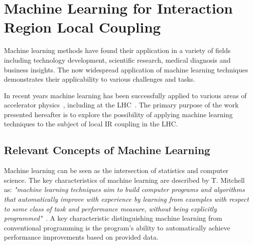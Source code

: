 \chapter{Machine Learning for Interaction Region Local Coupling}
\label{chapter:ml_local_coupling}

Machine learning methods have found their application in a variety of fields including technology development, scientific research, medical diagnosis and business insights.
The now widespread application of machine learning techniques demonstrates their applicability to various challenges and tasks.

In recent years machine learning has been successfully applied to various areas of accelerator physics~\cite{PRAB:Edelen:Machine_Learning_Optimization_Particle_Accelerator_Systems,PRAB:Gao:Bayesian_Optimization_Trajectory_Alignment,PRAB:Ivanov:Physics_Based_Deep_Neural_Networks_Beam_Dynamics,PRL:Roussel:Phase_Space_Reconstruction_Neural_Networks,PRAB:Kranjcevic:Multiobjective_Optimization_Dynamic_Aperture,PRL:Jalas:Bayesian_Optimization_Laser_Plasma_Accelerator,PRL:Duris:Bayesian_Optimization_Free_Electron_Laser,IPAC:Biedron:Adding_Data_Science_and_More_Intelligence_to_Our_Accelerator_Toolbox,IEEE:Edelen:Neural_Networks_Modeling_Control_Particle_Accelerators,PRAB:Emma:Machine_Learning_Longitudinal_Phase_Space_Prediction,IBIC:Xu:Machine_Learning_Image_Processing_Technology_Application_in_Bunch_Longitudinal_Phase_Data_Information_Extraction}, including at the \gls{LHC}~\cite{PRAB:Fol:Detection_Faulty_BPMs,EPJP:Fol:Supervised_Learning_Reconstruction_Magnet_Errors,PHD:Fol:Application_ML_Beam_Optics}.
The primary purpose of the work presented hereafter is to explore the possibility of applying machine learning techniques to the subject of local \gls{IR} coupling in the LHC.


\section{Relevant Concepts of Machine Learning}
\label{section:concepts_of_machine_learning}

Machine learning can be seen as the intersection of statistics and computer science.
The key characteristics of machine learning are described by T. Mitchell as: \textit{"machine learning techniques aim to build computer programs and algorithms that automatically improve with experience by learning from examples with respect to some class of task and performance measure, without being explicitly programmed"}~\cite{BOOK:Mitchell:Machine_Learning}.
A key characteristic distinguishing machine learning from conventional programming is the program's ability to automatically achieve performance improvements based on provided data.

